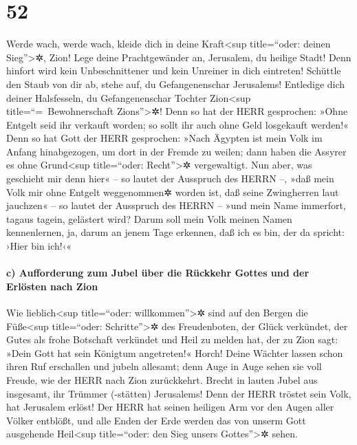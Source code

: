 \hypertarget{section-51}{%
\section{52}\label{section-51}}

Werde wach, werde wach, kleide dich in deine
Kraft\textless sup title=``oder: deinen Sieg''\textgreater✲, Zion! Lege
deine Prachtgewänder an, Jerusalem, du heilige Stadt! Denn hinfort wird
kein Unbeschnittener und kein Unreiner in dich eintreten!
Schüttle den Staub von dir ab, stehe auf, du
Gefangenenschar Jerusalems! Entledige dich deiner Halsfesseln, du
Gefangenenschar Tochter Zion\textless sup title=``=~Bewohnerschaft
Zions''\textgreater✲! Denn so hat der HERR gesprochen:
»Ohne Entgelt seid ihr verkauft worden; so sollt ihr auch ohne Geld
losgekauft werden!« Denn so hat Gott der HERR gesprochen:
»Nach Ägypten ist mein Volk im Anfang hinabgezogen, um dort in der
Fremde zu weilen; dann haben die Assyrer es ohne Grund\textless sup
title=``oder: Recht''\textgreater✲ vergewaltigt. Nun aber,
was geschieht mir denn hier« -- so lautet der Ausspruch des HERRN --,
»daß mein Volk mir ohne Entgelt weggenommen✲ worden ist, daß seine
Zwingherren laut jauchzen« -- so lautet der Ausspruch des HERRN -- »und
mein Name immerfort, tagaus tagein, gelästert wird? Darum
soll mein Volk meinen Namen kennenlernen, ja, darum an jenem Tage
erkennen, daß ich es bin, der da spricht: ›Hier bin ich!‹«

\hypertarget{c-aufforderung-zum-jubel-uxfcber-die-ruxfcckkehr-gottes-und-der-erluxf6sten-nach-zion}{%
\paragraph{c) Aufforderung zum Jubel über die Rückkehr Gottes und der
Erlösten nach
Zion}\label{c-aufforderung-zum-jubel-uxfcber-die-ruxfcckkehr-gottes-und-der-erluxf6sten-nach-zion}}

Wie lieblich\textless sup title=``oder:
willkommen''\textgreater✲ sind auf den Bergen die Füße\textless sup
title=``oder: Schritte''\textgreater✲ des Freudenboten, der Glück
verkündet, der Gutes als frohe Botschaft verkündet und Heil zu melden
hat, der zu Zion sagt: »Dein Gott hat sein Königtum angetreten!«
Horch! Deine Wächter lassen schon ihren Ruf erschallen und
jubeln allesamt; denn Auge in Auge sehen sie voll Freude, wie der HERR
nach Zion zurückkehrt. Brecht in lauten Jubel aus
insgesamt, ihr Trümmer (-stätten) Jerusalems! Denn der HERR tröstet sein
Volk, hat Jerusalem erlöst! Der HERR hat seinen heiligen
Arm vor den Augen aller Völker entblößt, und alle Enden der Erde werden
das von unserm Gott ausgehende Heil\textless sup title=``oder: den Sieg
unsers Gottes''\textgreater✲ sehen.

